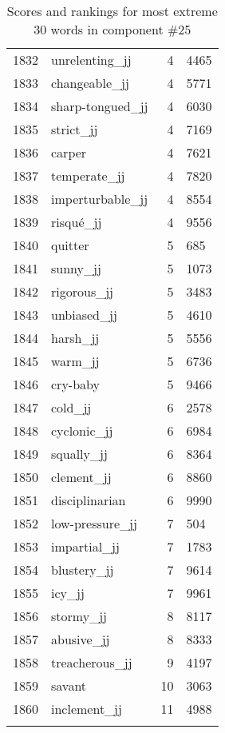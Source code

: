 \begin{longtable}[!htbp]{| rlr@{.}l |}
    1832 & unrelenting\_jj & 4 & 4465 \\
    1833 & changeable\_jj & 4 & 5771 \\
    1834 & sharp-tongued\_jj & 4 & 6030 \\
    1835 & strict\_jj & 4 & 7169 \\
    1836 & carper & 4 & 7621 \\
    1837 & temperate\_jj & 4 & 7820 \\
    1838 & imperturbable\_jj & 4 & 8554 \\
    1839 & risqué\_jj & 4 & 9556 \\
    1840 & quitter & 5 & 685 \\
    1841 & sunny\_jj & 5 & 1073 \\
    1842 & rigorous\_jj & 5 & 3483 \\
    1843 & unbiased\_jj & 5 & 4610 \\
    1844 & harsh\_jj & 5 & 5556 \\
    1845 & warm\_jj & 5 & 6736 \\
    1846 & cry-baby & 5 & 9466 \\
    1847 & cold\_jj & 6 & 2578 \\
    1848 & cyclonic\_jj & 6 & 6984 \\
    1849 & squally\_jj & 6 & 8364 \\
    1850 & clement\_jj & 6 & 8860 \\
    1851 & disciplinarian & 6 & 9990 \\
    1852 & low-pressure\_jj & 7 & 504 \\
    1853 & impartial\_jj & 7 & 1783 \\
    1854 & blustery\_jj & 7 & 9614 \\
    1855 & icy\_jj & 7 & 9961 \\
    1856 & stormy\_jj & 8 & 8117 \\
    1857 & abusive\_jj & 8 & 8333 \\
    1858 & treacherous\_jj & 9 & 4197 \\
    1859 & savant & 10 & 3063 \\
    1860 & inclement\_jj & 11 & 4988 \\
    \hline
    \caption{Scores and rankings for most extreme 30 words in component \#25} \\
\end{longtable}
